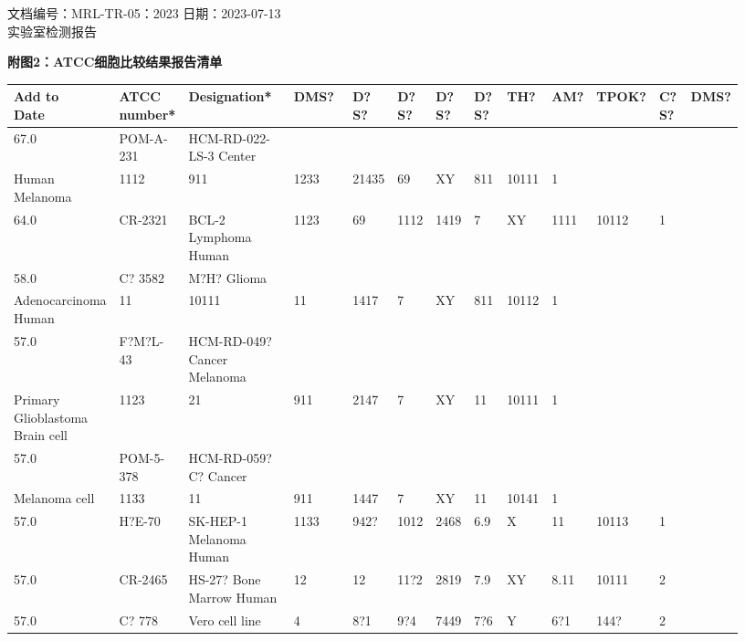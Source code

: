 \documentclass[UTF8,10pt,a4paper,fontset=fandol]{ctexart}
\begin{document}
\newpage

\noindent 文档编号：MRL-TR-05：2023 \hfill 日期：2023-07-13\\
\noindent 实验室检测报告

\begin{center}
\textbf{附图2：ATCC细胞比较结果报告清单}
\end{center}


\begin{center}
\scriptsize
\begin{tabular}{|p{0.055\linewidth}|p{0.075\linewidth}|p{0.19\linewidth}|p{0.11\linewidth}|p{0.055\linewidth}|p{0.055\linewidth}|p{0.055\linewidth}|p{0.055\linewidth}|p{0.055\linewidth}|p{0.055\linewidth}|p{0.055\linewidth}|p{0.055\linewidth}|p{0.055\linewidth}|}
\hline
\textbf{Add to\\Date} &
\textbf{ATCC\\number*} &
\textbf{Designation*} &
\textbf{DMS?} &
\textbf{D?S?} &
\textbf{D?S?} &
\textbf{D?S?} &
\textbf{D?S?} &
\textbf{TH?} &
\textbf{AM?} &
\textbf{TPOK?} &
\textbf{C?S?} &
\textbf{DMS?}\\
\hline
67.0 & POM-A-231 &
HCM-RD-022-LS-3 Center\\
Human Melanoma &
1112 & 911 & 1233 & 21435 & 69 & XY & 811 & 10111 & 1\\
\hline
64.0 & CR-2321 &
BCL-2 Lymphoma Human &
1123 & 69 & 1112 & 1419 & 7 & XY & 1111 & 10112 & 1\\
\hline
58.0 & C? 3582 &
M?H? Glioma\\
Adenocarcinoma Human &
11 & 10111 & 11 & 1417 & 7 & XY & 811 & 10112 & 1\\
\hline
57.0 & F?M?L-43 &
HCM-RD-049? Cancer Melanoma\\
Primary Glioblastoma Brain cell &
1123 & 21 & 911 & 2147 & 7 & XY & 11 & 10111 & 1\\
\hline
57.0 & POM-5-378 &
HCM-RD-059? C? Cancer\\
Melanoma cell &
1133 & 11 & 911 & 1447 & 7 & XY & 11 & 10141 & 1\\
\hline
57.0 & H?E-70 &
SK-HEP-1 Melanoma Human &
1133 & 942? & 1012 & 2468 & 6.9 & X & 11 & 10113 & 1\\
\hline
57.0 & CR-2465 &
HS-27? Bone Marrow Human &
12 & 12 & 11?2 & 2819 & 7.9 & XY & 8.11 & 10111 & 2\\
\hline
57.0 & C? 778 &
Vero cell line &
4 & 8?1 & 9?4 & 7449 & 7?6 & Y & 6?1 & 144? & 2\\
\hline
\end{tabular}
\end{center}
\end{document}
